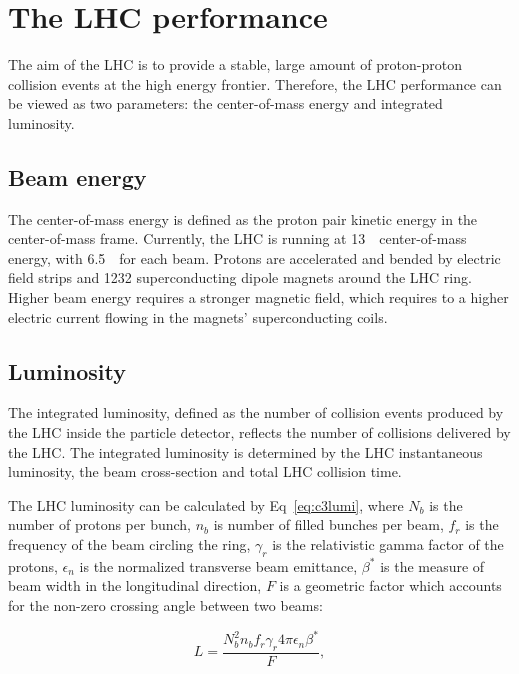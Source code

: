 \section{The LHC performance}
\label{sec:lhcs1}
\par The aim of the LHC is to provide a stable, large amount of proton-proton collision events at the high energy frontier. Therefore, the LHC performance can be viewed as two parameters: the center-of-mass energy and integrated luminosity.

\subsection{Beam energy}
\par The center-of-mass energy is defined as the proton pair kinetic energy in the center-of-mass frame. Currently, the LHC is running at 13~\TeV~center-of-mass energy, with 6.5~\TeV~for each beam. Protons are accelerated and bended by electric field strips and 1232 superconducting dipole magnets around the LHC ring. Higher beam energy requires a stronger magnetic field, which requires to a higher electric current flowing in the magnets' superconducting coils.

\subsection{Luminosity}
\par The integrated luminosity, defined as the number of collision events produced by the LHC inside the particle detector, reflects the number of collisions delivered by the LHC. The integrated luminosity is determined by the LHC instantaneous luminosity, the beam cross-section and total LHC collision time.

\par The LHC luminosity can be calculated by Eq~\ref{eq:c3lumi}, where $N_{b}$ is the number of protons per bunch, $n_{b}$ is number of filled bunches per beam, $f_{r}$ is the frequency of the beam circling the ring, $\gamma_{r}$ is the relativistic gamma factor of the protons, $\epsilon_{n}$ is the normalized transverse beam emittance, $\beta^{*}$ is the measure of beam width in the longitudinal direction, $F$ is a geometric factor which accounts for the non-zero crossing angle between two beams:

\begin{equation}
  L = \frac{N_{b}^{2}n_{b}f_{r}\gamma_{r}4\pi\epsilon_{n}\beta^{*}}{F},
  \label{eq:c3lumi}
\end{equation}

